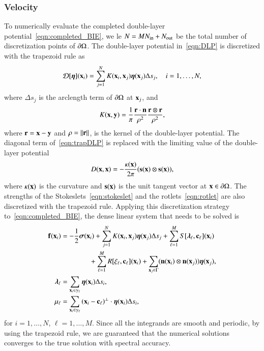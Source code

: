 \documentclass[preprint, 10pt]{elsarticle}
\begin{document}
\subsubsection{Velocity}
To numerically evaluate the completed double-layer
potential~\eqref{eqn:completed_BIE}, we le $N = MN_{\mathrm{in}} + N_{\mathrm{out}}$ be the
total number of discretization points of ${\partial}\Omega$.  The double-layer
potential in~\eqref{eqn:DLP} is discretized with the trapezoid rule as
\begin{align}
  {\mathcal{D}}[{\boldsymbol\eta}]({\mathbf{x}}_i) = \sum_{j=1}^{N} K({\mathbf{x}}_i,{\mathbf{x}}_j) {\boldsymbol\eta}({\mathbf{x}}_j) 
      \Delta s_{j}, \quad i=1,\ldots,N,
  \label{eqn:trapDLP}
\end{align}
where $\Delta s_j$ is the arclength term of ${\partial}\Omega$ at
${\mathbf{x}}_j$, and
\begin{align*}
  K({\mathbf{x}},{\mathbf{y}}) = \frac{1}{\pi} \frac{{\mathbf{r}} \cdot {\mathbf{n}}}{\rho^2} 
      \frac{{\mathbf{r}} \otimes {\mathbf{r}}}{\rho^2},
\end{align*}
where ${\mathbf{r}} = {\mathbf{x}} - {\mathbf{y}}$ and $\rho = \|{\mathbf{r}}\|$, is the kernel of the
double-layer potential.  The diagonal term of~\eqref{eqn:trapDLP} is
replaced with the limiting value of the double-layer potential
\begin{align*}
  D({\mathbf{x}},{\mathbf{x}}) = -\frac{\kappa({\mathbf{x}})}{2\pi}({\mathbf{s}}({\mathbf{x}}) \otimes {\mathbf{s}}({\mathbf{x}})),
\end{align*}
where $\kappa({\mathbf{x}})$ is the curvature and ${\mathbf{s}}({\mathbf{x}})$ is the unit tangent
vector at ${\mathbf{x}} \in {\partial}\Omega$.  The strengths of the
Stokeslets~\eqref{eqn:stokeslet} and the rotlets~\eqref{eqn:rotlet} are
also discretized with the trapezoid rule.  Applying this discretization
strategy to~\eqref{eqn:completed_BIE}, the dense linear system that
needs to be solved is
\begin{equation}
  \label{eqn:completed_BIE_discretized}
  \begin{aligned}
    {\mathbf{f}}({\mathbf{x}}_i) &= -\frac{1}{2}{\boldsymbol\sigma}({\mathbf{x}}_i) + \sum_{j=1}^{N} 
      K({\mathbf{x}}_i,{\mathbf{x}}_j) {\boldsymbol\eta}({\mathbf{x}}_j) \Delta s_{j} + 
      \sum_{\ell=1}^M S[{\boldsymbol\lambda}_\ell,{\mathbf{c}}_\ell]({\mathbf{x}}_i) \\
      &\hspace{40pt}
      +\sum_{\ell=1}^M R[\xi_\ell,{\mathbf{c}}_\ell]({\mathbf{x}}_i) 
      +\sum_{{\mathbf{x}}_j \in \Gamma} ({\mathbf{n}}({\mathbf{x}}_i) \otimes
      {\mathbf{n}}({\mathbf{x}}_j)){\boldsymbol\eta}({\mathbf{x}}_j), \\
    {\boldsymbol\lambda}_\ell &= \sum_{{\mathbf{x}}_i \in \gamma_\ell} {\boldsymbol\eta}({\mathbf{x}}_i) 
      \Delta s_i, \\ 
    \mu_\ell &= \sum_{{\mathbf{x}}_i \in \gamma_\ell}
      {({\mathbf{x}}_i - {\mathbf{c}}_\ell)}^\perp \cdot {\boldsymbol\eta}({\mathbf{x}}_i) \Delta s_i,
  \end{aligned}
\end{equation}
for $i=1,\ldots,N$, $\ell=1,\ldots,M$.  Since all the integrands are
smooth and periodic, by using the trapezoid rule, we are guaranteed that
the numerical solutions converges to the true solution with spectral
accuracy.
\end{document}
